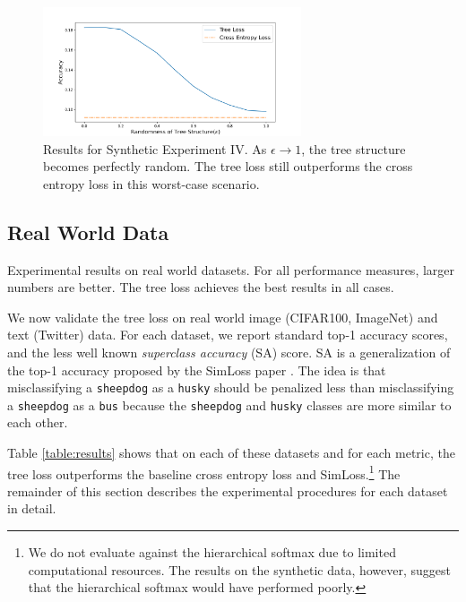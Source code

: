 \documentclass[twoside]{article}
\begin{document}
\begin{figure}
\includegraphics[width=\columnwidth,height=1.5in]{fig/new_img/loss_vs_structure.png}
\caption{
Results for Synthetic Experiment IV.
As $\epsilon\to1$, 
the tree structure becomes perfectly random.
The tree loss still outperforms the cross entropy loss in this worst-case scenario.
}  
\label{fig:synth:eps}
\end{figure}




\subsection{Real World Data}

\begin{table}
    \centering
    
    \caption{Experimental results on real world datasets.  For all performance measures, larger numbers are better.  The tree loss achieves the best results in all cases.}
    \label{table:results}
\end{table}

We now validate the tree loss on real world image (CIFAR100, ImageNet) and text (Twitter) data.
For each dataset, we report standard top-1 accuracy scores,
and the less well known \emph{superclass accuracy} (SA) score.
SA is a generalization of the top-1 accuracy proposed by the SimLoss paper \citep{Kobs2020SimLossCS}.
The idea is that misclassifying a \texttt{sheepdog} as a \texttt{husky} should be penalized less than misclassifying a \texttt{sheepdog} as a \texttt{bus} because the \texttt{sheepdog} and \texttt{husky} classes are more similar to each other.

Table \ref{table:results} shows that on each of these datasets and for each metric,
the tree loss outperforms the baseline cross entropy loss and SimLoss.\footnote{We do not evaluate against the hierarchical softmax due to limited computational resources.  The results on the synthetic data, however, suggest that the hierarchical softmax would have performed poorly.}
The remainder of this section describes the experimental procedures for each dataset in detail.
\end{document}
